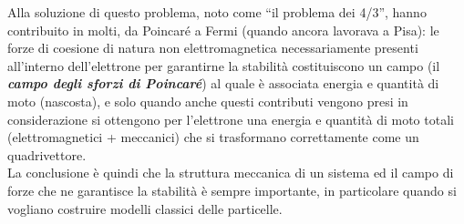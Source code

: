 Alla soluzione di questo problema, noto come ``il problema dei 4/3'', hanno
contribuito in molti, da Poincar\'e a Fermi (quando ancora lavorava a Pisa): le
forze di coesione di natura non elettromagnetica necessariamente presenti
all'interno dell'elettrone per garantirne la stabilit\`a costituiscono un campo
(il \textbf{\textit{campo degli sforzi di Poincar\'e}}) al quale \`e associata
energia e quantit\`a di moto (nascosta), e solo quando anche questi contributi
vengono presi in considerazione si ottengono per l'elettrone una energia e
quantit\`a di moto totali (elettromagnetici + meccanici) che si trasformano
correttamente come un quadrivettore.\\
La conclusione \`e quindi che la struttura meccanica di un sistema ed il campo
di forze che ne garantisce la stabilit\`a \`e sempre importante, in particolare
quando si vogliano costruire modelli classici delle particelle.
